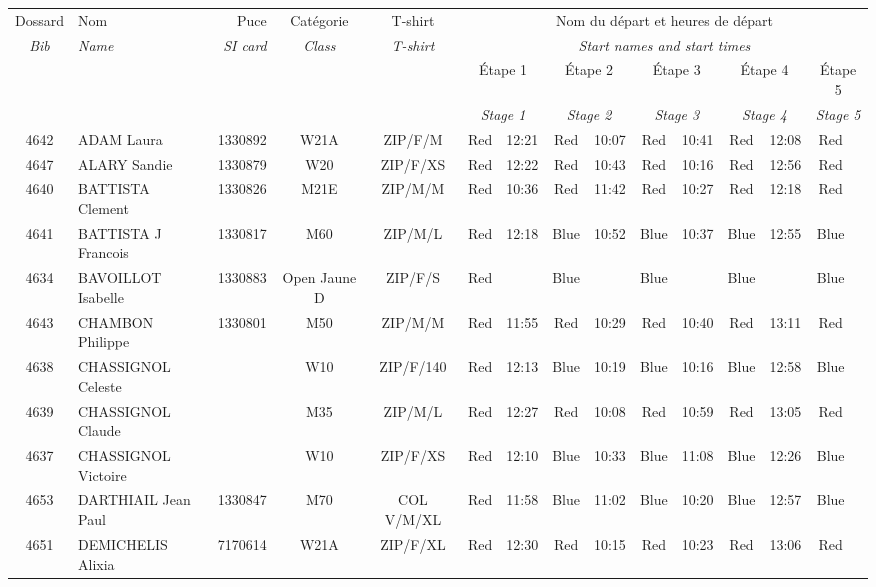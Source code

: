 \documentclass{report}
\begin{document}
  \begin{longtable}{|c|l|r|c|c|*{5}{cc|}}
    Dossard & Nom  & Puce    & Catégorie & T-shirt & \multicolumn{10}{c|}{Nom du départ et heures de départ} \\
    \itshape Bib     & \itshape Name & \itshape SI card & \itshape Class  & \itshape  T-shirt  & \multicolumn{10}{c|}{\itshape Start names and start times} \\
    \hline
    & & & & & \multicolumn{2}{c|}{Étape 1} & \multicolumn{2}{c|}{Étape 2} & \multicolumn{2}{c|}{Étape 3} & \multicolumn{2}{c|}{Étape 4} & \multicolumn{2}{c|}{Étape 5} \\
    & & & & & \multicolumn{2}{c|}{\itshape Stage 1} & \multicolumn{2}{c|}{\itshape Stage 2} & \multicolumn{2}{c|}{\itshape Stage 3} & \multicolumn{2}{c|}{\itshape Stage 4} & \multicolumn{2}{c|}{\itshape Stage 5} \\
    \hline
    4642 & ADAM Laura & 1330892 & W21A & ZIP/F/M & Red & 12:21 & Red & 10:07 & Red & 10:41 & Red & 12:08 & Red &  \\
    4647 & ALARY Sandie & 1330879 & W20 & ZIP/F/XS & Red & 12:22 & Red & 10:43 & Red & 10:16 & Red & 12:56 & Red &  \\
    4640 & BATTISTA Clement & 1330826 & M21E & ZIP/M/M & Red & 10:36 & Red & 11:42 & Red & 10:27 & Red & 12:18 & Red &  \\
    4641 & BATTISTA J Francois & 1330817 & M60 & ZIP/M/L & Red & 12:18 & Blue & 10:52 & Blue & 10:37 & Blue & 12:55 & Blue &  \\
    4634 & BAVOILLOT Isabelle & 1330883 & Open Jaune D & ZIP/F/S & Red &   & Blue &   & Blue &   & Blue &   & Blue &  \\
    4643 & CHAMBON Philippe & 1330801 & M50 & ZIP/M/M & Red & 11:55 & Red & 10:29 & Red & 10:40 & Red & 13:11 & Red &  \\
    4638 & CHASSIGNOL Celeste &  & W10 & ZIP/F/140 & Red & 12:13 & Blue & 10:19 & Blue & 10:16 & Blue & 12:58 & Blue &  \\
    4639 & CHASSIGNOL Claude &  & M35 & ZIP/M/L & Red & 12:27 & Red & 10:08 & Red & 10:59 & Red & 13:05 & Red &  \\
    4637 & CHASSIGNOL Victoire &  & W10 & ZIP/F/XS & Red & 12:10 & Blue & 10:33 & Blue & 11:08 & Blue & 12:26 & Blue &  \\
    4653 & DARTHIAIL Jean Paul & 1330847 & M70 & COL V/M/XL & Red & 11:58 & Blue & 11:02 & Blue & 10:20 & Blue & 12:57 & Blue &  \\
    4651 & DEMICHELIS Alixia & 7170614 & W21A & ZIP/F/XL & Red & 12:30 & Red & 10:15 & Red & 10:23 & Red & 13:06 & Red &  \\

\end{longtable}
\end{document}
